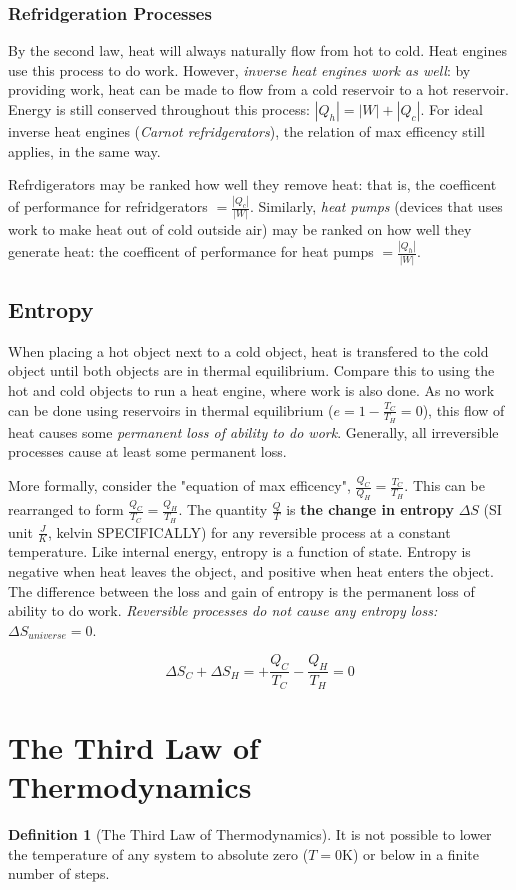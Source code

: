 \documentclass[12pt, a4paper]{article}
\theoremstyle{definition}
\newtheorem{definition}{Definition}
\begin{document}
\subsubsection{Refridgeration Processes}
By the second law, heat will always naturally flow from hot to cold.
Heat engines use this process to do work.
However, \textit{inverse heat engines work as well}: by providing work, heat can be made to flow from a cold reservoir to a hot reservoir.
Energy is still conserved throughout this process: $|Q_h| = |W| + |Q_c|$.
For ideal inverse heat engines (\textit{Carnot refridgerators}), the relation of max efficency still applies, in the same way.

Refrdigerators may be ranked how well they remove heat: that is, the coefficent of performance for refridgerators $= \frac{|Q_c|}{|W|}$.
Similarly, \textit{heat pumps} (devices that uses work to make heat out of cold outside air) may be ranked on how well they generate heat: the coefficent of performance for heat pumps $= \frac{|Q_h|}{|W|}$.

\subsection{Entropy}
When placing a hot object next to a cold object, heat is transfered to the cold object until both objects are in thermal equilibrium.
Compare this to using the hot and cold objects to run a heat engine, where work is also done.
As no work can be done using reservoirs in thermal equilibrium ($e = 1 - \frac{T_C}{T_H} = 0$), this flow of heat causes some \textit{permanent loss of ability to do work}.
Generally, all irreversible processes cause at least some permanent loss.

More formally, consider the "equation of max efficency", $\frac{Q_C}{Q_H} = \frac{T_C}{T_H}$.
This can be rearranged to form $\frac{Q_C}{T_C} = \frac{Q_H}{T_H}$.
The quantity $\frac{Q}{T}$ is \textbf{the change in entropy} $\Delta S$ (SI unit $\frac{J}{K}$, kelvin SPECIFICALLY) for any reversible process at a constant temperature.
Like internal energy, entropy is a function of state.
Entropy is negative when heat leaves the object, and positive when heat enters the object.
The difference between the loss and gain of entropy is the permanent loss of ability to do work.
\textit{Reversible processes do not cause any entropy loss:} $\Delta S_{universe} = 0$.

\[\Delta S_C + \Delta S_H = +\frac{Q_C}{T_C} - \frac{Q_H}{T_H} = 0\]



\section{The Third Law of Thermodynamics}
\begin{definition}[The Third Law of Thermodynamics]
    It is not possible to lower the temperature of any system to absolute zero ($T = 0\textrm{K}$) or below in a finite number of steps.
\end{definition}
\end{document}
